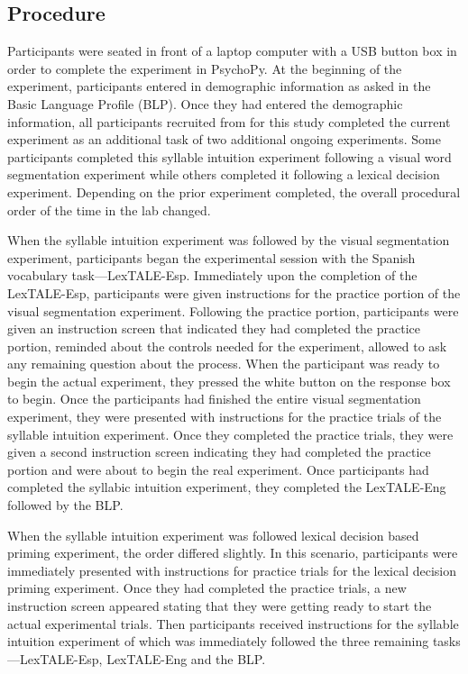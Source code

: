 \documentclass[
12pt, %
english, %
doublespacing, %
nolistspacing, %
liststotoc, %
headsepline, %
chapterinoneline, %
openany, %
]{DoctoralThesis}\usepackage[]{graphicx}\usepackage[]{color}
\begin{document}



\subsection{Procedure}
Participants were seated in front of a laptop computer with a USB button box in order to complete the experiment in PsychoPy. At the beginning of the experiment, participants entered in demographic information as asked in the Basic Language Profile (BLP). Once they had entered the demographic information, all participants recruited from for this study completed the current experiment as an additional task of two additional ongoing experiments. Some participants completed this syllable intuition experiment following a visual word segmentation experiment while others completed it following a lexical decision experiment. Depending on the prior experiment completed, the overall procedural order of the time in the lab changed.

When the syllable intuition experiment was followed by the visual segmentation experiment, %
participants began the experimental session with the Spanish vocabulary task---LexTALE-Esp. Immediately upon the completion of the LexTALE-Esp, participants were given instructions for the practice portion of the visual segmentation experiment. Following the practice portion, participants were given an instruction screen that indicated they had completed the practice portion, reminded about the controls needed for the experiment, allowed to ask any remaining question about the process. When the participant was ready to begin the actual experiment, they pressed the white button on the response box to begin. Once the participants had finished the entire visual segmentation experiment, they were presented with instructions for the practice trials of the syllable intuition experiment. Once they completed the practice trials, they were given a second instruction screen indicating they had completed the practice portion and were about to begin the real experiment. Once participants had completed the syllabic intuition experiment, they completed the LexTALE-Eng followed by the BLP. 

When the syllable intuition experiment was followed lexical decision based priming experiment, the order differed slightly. In this scenario, participants were immediately presented with instructions for practice trials for the lexical decision priming experiment. Once they had completed the practice trials, a new instruction screen appeared stating that they were getting ready to start the actual experimental trials. Then participants received instructions for the syllable intuition experiment of which was immediately followed the three remaining tasks---LexTALE-Esp, LexTALE-Eng and the BLP.
\end{document}
